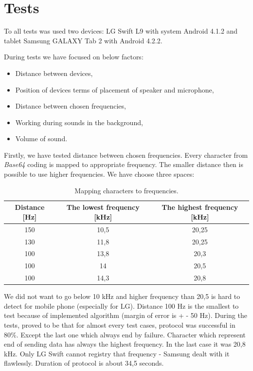 \documentclass[11pt,titlepage]{article}
\theoremstyle{plain}
\begin{document}
\section{Tests}
To all tests was used two devices: LG Swift L9 with system Android 4.1.2 and tablet Samsung GALAXY Tab 2 with Android 4.2.2. 

During tests we have focused on below factors:
\begin{itemize}
\item Distance between devices,
\item Position of devices terms of placement of speaker and microphone,
\item Distance between chosen frequencies,
\item Working during sounds in the background,
\item Volume of sound.
\end{itemize}

Firstly, we have tested distance between chosen frequencies. Every character from \textit{Base64} coding is mapped to appropriate frequency. The smaller distance then is possible to use higher frequencies. We have choose three spaces:
\begin{table}[H]
	\centering
	\begin{tabular}{| c | c | c |}
		\hline
		Distance [Hz] & The lowest frequency [kHz] & The highest frequency [kHz]\\
		\hline
		150 & 10,5 & 20,25 \\
		\hline
		130 & 11,8 & 20,25 \\
		\hline
		100 & 13,8 & 20,3 \\
		\hline
		100 & 14 & 20,5 \\
		\hline
		100 & 14,3 & 20,8 \\
		\hline
	\end{tabular}
	\caption{Mapping characters to frequencies.}
\end{table}

We did not want to go below 10 kHz and higher frequency than 20,5 is hard to detect for mobile phone (especially for LG). Distance 100 Hz is the smallest to test because of implemented algorithm (margin of error is + - 50 Hz). During the tests, proved to be that for almost every test cases, protocol was successful in 80\%. Except the last one which always end by failure. Character which represent end of sending data has always the highest frequency. In the last case it was 20,8 kHz. Only LG Swift cannot registry that frequency - Samsung dealt with it flawlessly. Duration of protocol is about 34,5 seconds.
\end{document}
